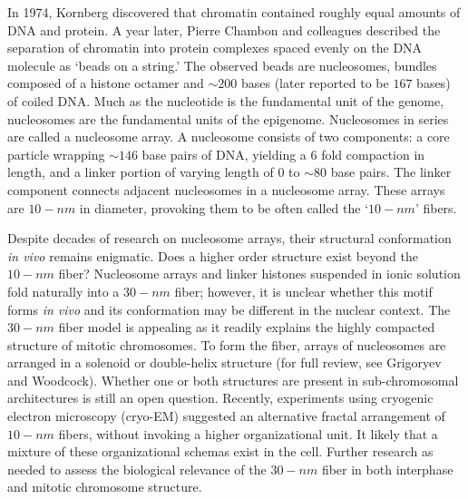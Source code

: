 In 1974, Kornberg discovered that chromatin contained roughly equal amounts of \gls{DNA} and protein\cite{kornberg1974}.  A year later, Pierre Chambon
and colleagues described the separation of chromatin into protein complexes spaced evenly on the \gls{DNA} molecule as `beads on a string.'\cite{oudet1975}
The observed beads are nucleosomes, bundles composed of a histone octamer and $\sim200$ bases (later reported to be $167$ bases\cite{robinson2006}) of
coiled \gls{DNA}. Much as the nucleotide is the fundamental unit of the genome, nucleosomes are the fundamental units of the epigenome.  Nucleosomes in
series are called a \gls{nucleosome array}.  A nucleosome consists of two components: a core particle wrapping $\sim146$ base pairs of DNA, yielding a
6 fold compaction in length, and a linker portion of varying length of $0$ to $\sim80$ base pairs.  The linker component connects adjacent nucleosomes
in a nucleosome array\cite{wu2007}\cite{hansen2012}.  These arrays are $10-nm$ in diameter, provoking them to be often called the `$10-nm$' fibers.

Despite decades of research on nucleosome arrays, their structural conformation \textit{\gls{in vivo}} remains enigmatic.   Does a higher order structure
exist beyond the $10-nm$ fiber?  Nucleosome arrays and linker histones suspended in ionic solution fold naturally into a $30-nm$ fiber\cite{tremethick2007};
however, it is unclear whether this motif forms \textit{\gls{in vivo}} and its conformation may be different in the nuclear context\cite{bian2012}.
The $30-nm$ fiber model is appealing as it readily explains the highly compacted structure of mitotic chromosomes.  To form the fiber, arrays of nucleosomes
are arranged in a solenoid or double-helix structure (for full review, see Grigoryev and Woodcock\cite{grigoryev2012}).  Whether one or both structures
are present in sub-chromosomal architectures is still an open question\cite{song2014}.  Recently, experiments using cryogenic electron microscopy
(cryo-EM) suggested an alternative fractal arrangement of $10-nm$ fibers, without invoking a higher organizational unit\cite{nishino2012}\cite{hansen2012}.
It likely that a mixture of these organizational schemas exist in the cell.  Further research as needed to assess the biological relevance of the $30-nm$ fiber in
both interphase and mitotic chromosome structure.


